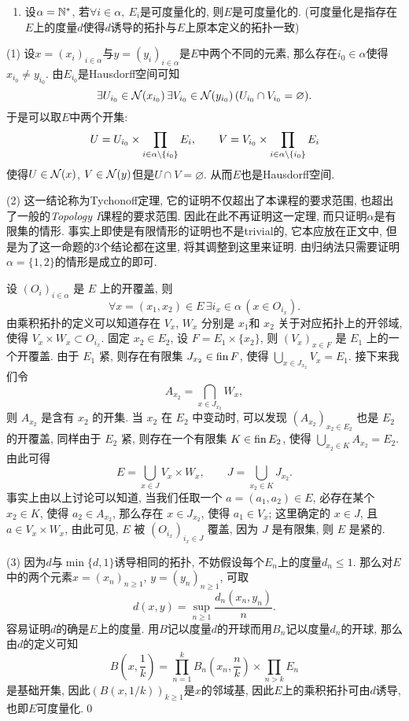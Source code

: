 \begin{appendix}
\begin{enumerate}[(1)]
		\item 设$ \alpha=\mathbb{N}^\ast $, 若$ \forall i\in\alpha,\ E_i $是可度量化的, 则$ E $是可度量化的. (可度量化是指存在$ E $上的度量$ d $使得$ d $诱导的拓扑与$ E $上原本定义的拓扑一致)
		\end{enumerate}
	\begin{Proof}
	(1) 设$ x=(x_i)_{i\in\alpha} $与$ y=(y_i)_{i\in\alpha} $是$ E $中两个不同的元素, 那么存在$ i_0\in\alpha $使得$ x_{i_0}\ne y_{i_0} $. 由$ E_{i_0} $是Hausdorff空间可知
	\[
	\exists U_{i_0}\in\mathcal{N}(x_{i_0})\,\exists V_{i_0}\in\mathcal{N}(y_{i_0})\,(U_{i_0}\cap V_{i_0}=\varnothing).
	\]
	于是可以取$ E $中两个开集:
	\[
	U=U_{i_0}\times\prod_{i\in\alpha\setminus\{i_0\}}E_i,\qquad V=V_{i_0}\times\prod_{i\in\alpha\setminus\{i_0\}}E_i
	\]
	使得$ U\in\mathcal{N}(x) $, $ V\in\mathcal{N}(y) $但是$ U\cap V=\varnothing $. 从而$ E $也是Hausdorff空间.
	
	(2) 这一结论称为Tychonoff定理, 它的证明不仅超出了本课程的要求范围, 也超出了一般的\textsl{Topology I}课程的要求范围. 因此在此不再证明这一定理, 而只证明$ \alpha $是有限集的情形. 事实上即使是有限情形的证明也不是trivial的, 它本应放在正文中, 但是为了这一命题的3个结论都在这里, 将其调整到这里来证明. 由归纳法只需要证明$ \alpha=\{1,2\} $的情形是成立的即可.
	
	设 $ (O_{i})_{i\in\alpha} $ 是 $ E $ 上的开覆盖, 则
	\[
		\forall x=(x_{1}, x_{2})\in E\,\exists i_{x}\in\alpha\,(x\in O_{i_{x}}).
	\]
	由乘积拓扑的定义可以知道存在 $ V_{x} $, $ W_{x} $ 分别是 $ x_{1} $和 $ x_{2} $ 关于对应拓扑上的开邻域, 使得 $ V_{x}\times W_{x}\subset O_{i_{x}} $. 固定 $ x_{2}\in E_{2} $, 设 $ F=E_{1}\times \{ x_{2} \} $, 则 $ (V_{x})_{x\in F} $ 是 $ E_{1} $ 上的一个开覆盖. 由于 $ E_{1} $ 紧, 则存在有限集 $ J_{x_{2}}\in \operatorname{fin} F $, 使得 $ \bigcup_{x\in J_{x_{2}}}V_{x}=E_{1} $. 接下来我们令
	\[
		A_{x_{2}}=\bigcap_{x\in J_{x_{2}}}W_{x},
	\]
	则 $ A_{x_{2}} $ 是含有 $ x_{2} $ 的开集. 当 $ x_{2} $ 在 $ E_{2} $ 中变动时, 可以发现 $ (A_{x_{2}})_{x_{2}\in E_{2}} $ 也是 $ E_{2} $ 的开覆盖, 同样由于 $ E_{2} $ 紧, 则存在一个有限集 $ K\in\operatorname{fin} E_{2} $, 使得 $ \bigcup_{x_{2}\in K}A_{x_{2}}=E_{2} $. 由此可得
	\[
		E=\bigcup_{x\in J} V_{x}\times W_{x},\qquad J=\bigcup_{x_{2}\in K}J_{x_{2}}.
	\]
	事实上由以上讨论可以知道, 当我们任取一个 $ a=(a_{1}, a_{2})\in E $, 必存在某个 $ x_{2}\in K $, 使得 $ a_{2}\in A_{x_{2}} $, 那么存在 $ x\in J_{x_{2}} $, 使得 $ a_{1}\in V_{x} $; 这里确定的 $ x\in J $, 且 $ a\in V_{x}\times W_{x} $, 由此可见,  $ E $ 被 $ (O_{i_{x}})_{i_{x}\in J} $ 覆盖, 因为 $ J $ 是有限集, 则 $ E $ 是紧的.
	
	(3) 因为$ d $与$ \min\{d,1\} $诱导相同的拓扑, 不妨假设每个$ E_n $上的度量$ d_n\leqslant 1 $. 那么对$ E $中的两个元素$ x=(x_n)_{n\geqslant 1} $, $ y=(y_n)_{n\geqslant 1} $, 可取
	\[
	d(x,y)=\sup_{n\geqslant 1}\frac{d_n(x_n,y_n)}{n}.
	\]
	容易证明$ d $的确是$ E $上的度量. 用$ B $记以度量$ d $的开球而用$ B_n $记以度量$ d_n $的开球, 那么由$ d $的定义可知
	\[
	B\left(x,\frac{1}{k}\right)=\prod_{n=1}^kB_n\left(x_n,\frac{n}{k}\right)\times\prod_{n>k}E_n
	\]
	是基础开集, 因此$ (B(x,1/k))_{k\geqslant 1} $是$ x $的邻域基, 因此$ E $上的乘积拓扑可由$ d $诱导, 也即$ E $可度量化.\qed
	     

\end{Proof}
\end{appendix}

